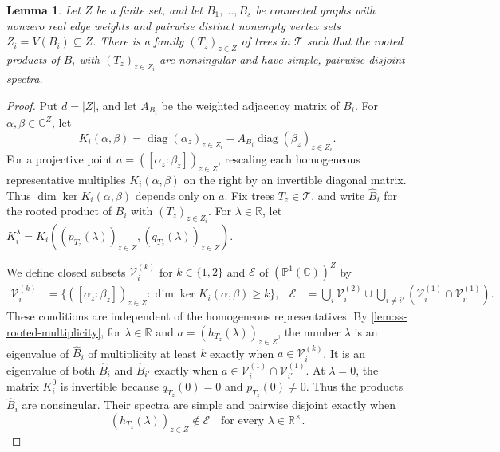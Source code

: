 \documentclass[11pt,a4paper]{article}
\theoremstyle{plain}
\newtheorem{lemma}[theorem]{Lemma}
\theoremstyle{definition}
\DeclareMathOperator{\diag}{diag}
\newcommand{\R}{\mathbb{R}}
\begin{document}
\begin{lemma}\label{lem:ss-separation}
Let $Z$ be a finite set, and let $B_1,\ldots,B_s$ be connected graphs
with nonzero real edge weights and pairwise distinct nonempty vertex sets
$Z_i=V(B_i)\subseteq Z$.
There is a family $(T_z)_{z\in Z}$ of trees in $\mathcal T$ such that the rooted products
of $B_i$ with $(T_z)_{z\in Z_i}$ are nonsingular and have simple, pairwise
disjoint spectra.
\end{lemma}
\begin{proof}
Put $d=|Z|$, and let $A_{B_i}$ be the weighted adjacency matrix of $B_i$.
For $\alpha,\beta\in\mathbb C^Z$, let
\begin{equation}\label{eq:ss-core}
 K_i(\alpha,\beta)=\diag(\alpha_z)_{z\in Z_i}-A_{B_i}\diag(\beta_z)_{z\in Z_i}.
\end{equation}
For a projective point $a=([\alpha_z:\beta_z])_{z\in Z}$,
rescaling each homogeneous representative multiplies $K_i(\alpha,\beta)$
on the right by an invertible diagonal matrix.
Thus $\dim\ker K_i(\alpha,\beta)$ depends only on $a$.
Fix trees $T_z\in\mathcal T$, and write $\widehat B_i$ for the rooted
product of $B_i$ with $(T_z)_{z\in Z_i}$.
For $\lambda\in\R$, let
$K_i^\lambda=K_i((p_{T_z}(\lambda))_{z\in Z},(q_{T_z}(\lambda))_{z\in Z})$.

We define closed subsets $\mathcal V_i^{(k)}$ for $k\in\{1,2\}$
and $\mathcal E$ of $(\mathbb P^1(\mathbb C))^Z$ by
\begin{equation}\label{eq:ss-bad-sets}
 \begin{aligned}
 \mathcal V_i^{(k)}&=\{([\alpha_z:\beta_z])_{z\in Z}:\dim\ker K_i(\alpha,\beta)\ge k\}, &
 \mathcal E&=\bigcup_i\mathcal V_i^{(2)}
       \cup\bigcup_{i\ne i'}(\mathcal V_i^{(1)}\cap \mathcal V_{i'}^{(1)}).
 \end{aligned}
\end{equation}
These conditions are independent of the homogeneous representatives.
By \cref{lem:ss-rooted-multiplicity}, for $\lambda\in\R$ and
$a=(h_{T_z}(\lambda))_{z\in Z}$, the number $\lambda$ is an eigenvalue
of $\widehat B_i$ of multiplicity at least $k$ exactly when
$a\in\mathcal V_i^{(k)}$.
It is an eigenvalue of both $\widehat B_i$ and $\widehat B_{i'}$ exactly
when $a\in\mathcal V_i^{(1)}\cap\mathcal V_{i'}^{(1)}$.
At $\lambda=0$, the matrix $K_i^0$ is invertible
because $q_{T_z}(0)=0$ and $p_{T_z}(0)\ne0$.
Thus the products $\widehat B_i$ are nonsingular.
Their spectra are simple and pairwise disjoint exactly when
\begin{equation}\label{eq:ss-bad}
 (h_{T_z}(\lambda))_{z\in Z}\notin\mathcal E
 \quad\text{for every }\lambda\in\R^\times.
\end{equation}


\end{proof}
\end{document}
